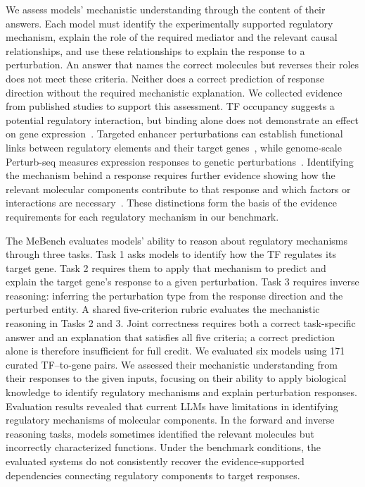 We assess models’ mechanistic understanding through the content of their answers. Each model must identify the experimentally supported regulatory mechanism, explain the role of the required mediator and the relevant causal relationships, and use these relationships to explain the response to a perturbation. An answer that names the correct molecules but reverses their roles does not meet these criteria. Neither does a correct prediction of response direction without the required mechanistic explanation. We collected evidence from published studies to support this assessment. TF occupancy suggests a potential regulatory interaction, but binding alone does not demonstrate an effect on gene expression~\cite{cusanovich2014functional}. Targeted enhancer perturbations can establish functional links between regulatory elements and their target genes~\cite{fulco2019activity}, while genome-scale Perturb-seq measures expression responses to genetic perturbations~\cite{replogle2022mapping}. Identifying the mechanism behind a response requires further evidence showing how the relevant molecular components contribute to that response and which factors or interactions are necessary~\cite{gallant2012deltanp63alpha}. These distinctions form the basis of the evidence requirements for each regulatory mechanism in our benchmark.

The MeBench evaluates models’ ability to reason about regulatory mechanisms through three tasks. Task 1 asks models to identify how the TF regulates its target gene. Task 2 requires them to apply that mechanism to predict and explain the target gene’s response to a given perturbation. Task 3 requires inverse reasoning: inferring the perturbation type from the response direction and the perturbed entity. A shared five-criterion rubric evaluates the mechanistic reasoning in Tasks 2 and 3. Joint correctness requires both a correct task-specific answer and an explanation that satisfies all five criteria; a correct prediction alone is therefore insufficient for full credit. We evaluated six models using 171 curated TF–to-gene pairs. We assessed their mechanistic understanding from their responses to the given inputs, focusing on their ability to apply biological knowledge to identify regulatory mechanisms and explain perturbation responses. Evaluation results revealed that current LLMs have limitations in identifying regulatory mechanisms of molecular components. In the forward and inverse reasoning tasks, models sometimes identified the relevant molecules but incorrectly characterized functions. Under the benchmark conditions, the evaluated systems do not consistently recover the evidence-supported dependencies connecting regulatory components to target responses.








